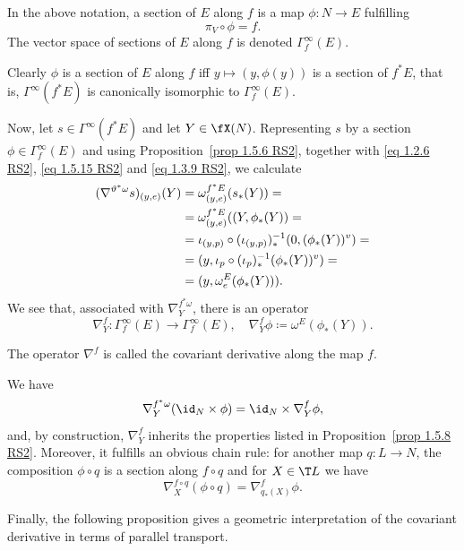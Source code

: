\begin{defn}
    In the above notation, a section of $E$ along $f$ is a map $\phi:N\to E$ fulfilling 
    \[\pi_V\circ \phi=f.\]
    The vector space of sections of $E$ along $f$ is denoted $\Gamma_f^\infty(E)$.
\end{defn}

Clearly $\phi$ is a section of $E$ along $f$ iff $y\mapsto (y,\phi(y))$ is a section of $f^\ast E$, that is, $\Gamma^\infty(f^\ast E)$ is canonically isomorphic to $\Gamma^\infty_f(E)$.

Now, let $s\in\Gamma^\infty(f^\ast E)$ and let $Y\in\fX(N)$. Representing $s$ by a section $\phi\in \Gamma^\infty_f(E)$ and using Proposition~\ref{prop 1.5.6 RS2}, together with \eqref{eq 1.2.6 RS2}, \eqref{eq 1.5.15 RS2} and \eqref{eq 1.3.9 RS2}, we calculate
\begin{align}
    (\nabla^{\vartheta^\ast\omega}s)_{(y,e)}(Y)&=\omega^{f^\ast E}_{(y,e)}(s_\ast(Y))=\notag\\
    &=\omega^{f^\ast E}_{(y,e)}((Y,\phi_\ast(Y))=\notag\\
    &=\iota_{(y,p)}\circ (\iota_{(y,p)})_\ast^{-1}(0,(\phi_\ast(Y))^v)=\notag\\
    &=(y,\iota_p\circ (\iota_p)_\ast^{-1}(\phi_\ast(Y))^v)=\notag\\
    &=(y,\omega^E_e(\phi_\ast(Y))).
\end{align}
We see that, associated with $\nabla^{f^\ast\omega}_Y$, there is an operator
\[\nabla^f_Y:\Gamma^\infty_f(E)\to \Gamma^\infty_f(E),\quad \nabla^f_Y \phi\coloneqq \omega^E(\phi_\ast(Y)).\label{eq 1.5.16 RS2}\]

\begin{defn}
    The operator $\nabla^f$ is called the covariant derivative along the map $f$.
\end{defn}

We have
\[\nabla_Y^{f^\ast\omega}(\id_N\times \phi)=\id_N\times \nabla^f_Y \phi,\]
and, by construction, $\nabla^f_Y$ inherits the properties listed in Proposition~\ref{prop 1.5.8 RS2}. Moreover, it fulfills an obvious chain rule: for another map $q:L\to N$, the composition $\phi\circ q$ is a section along $f\circ q$ and for $X\in \T L$ we have
\[\nabla_X^{f\circ q}(\phi\circ q)=\nabla^f_{q_\ast(X)}\phi.\]


Finally, the following proposition gives a geometric interpretation of the covariant derivative in terms of parallel transport.
  
